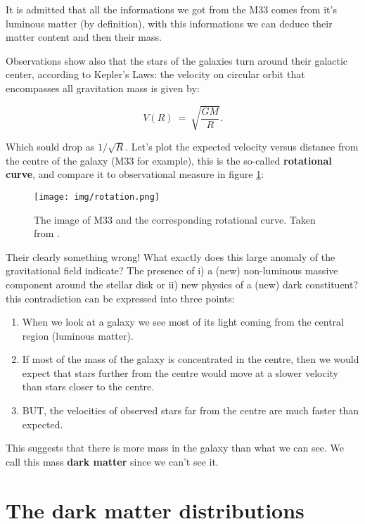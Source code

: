 \documentclass[12pt, letterpaper, twocolumn]{article}
\begin{document}
It is admitted that all the informations we got from the M33 comes from it's luminous matter (by definition), with this informations we can deduce their matter content and then their mass. 

Observations show also that the stars of the galaxies turn around their galactic center, according to Kepler's Laws: the velocity on circular orbit that encompasses all gravitation mass is given by: 

\begin{equation}
V(R)~=~\sqrt{\frac{GM}{R}}.
\end{equation}  

Which sould drop as $1/\sqrt{R}$. Let's plot the expected velocity versus distance from the centre of the galaxy (M33 for example), this is the so-called \textbf{rotational curve}, and compare it to observational measure in figure \ref{rotation}:

\begin{figure}[ht]
    \centering
    \texttt{[image: img/rotation.png]}
    \caption{The image of M33 and the corresponding rotational curve. Taken from \cite{Salucci_2019}.}
    \label{rotation}
\end{figure}

Their clearly something wrong! What exactly does this large anomaly of the gravitational field indicate? The presence of i) a (new) non-luminous massive component around the stellar disk or ii) new physics of a (new) dark constituent? this contradiction can be expressed into three points: 

\begin{enumerate}
\item When we look at a galaxy we see most of its light coming from the central region (luminous matter).
\item If most of the mass of the galaxy is concentrated in the centre, then we would expect that stars further from the centre would move at a slower velocity than stars closer to the centre.
\item BUT, the velocities of observed stars far from the centre are much faster than expected.
\end{enumerate}

This suggests that there is more mass in the galaxy than what we can see. We call this mass \textbf{dark matter} since we can't see it. 

\vspace{0.125in}
\section{\textbf{The dark matter distributions}}
\end{document}
